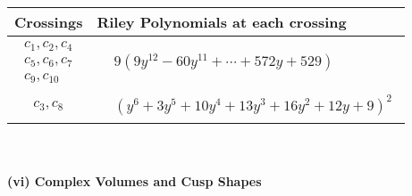 \documentclass[1p]{elsarticle_modified}
\theoremstyle{definition}
\begin{document}
\begin{tabular}{m{50pt}|m{274pt}}
Crossings & \hspace{64pt}Riley Polynomials at each crossing \\
\hline $$\begin{aligned}c_{1},c_{2},c_{4}\\c_{5},c_{6},c_{7}\\c_{9},c_{10}\end{aligned}$$&$\begin{aligned}
&9(9 y^{12}-60 y^{11}+\cdots+572 y+529)
\end{aligned}$\\
\hline $$\begin{aligned}c_{3},c_{8}\end{aligned}$$&$\begin{aligned}
&(y^6+3 y^5+10 y^4+13 y^3+16 y^2+12 y+9)^2
\end{aligned}$\\
\hline
\end{tabular}\\~\\
\newpage\flushleft \textbf{(vi) Complex Volumes and Cusp Shapes}
\end{document}
